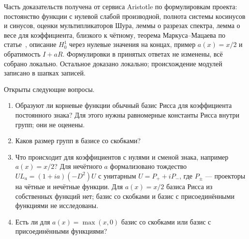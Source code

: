 \documentclass[12pt,a4paper]{article}
\begin{document}
Часть доказательств получена от сервиса Aristotle по формулировкам проекта: постоянство
функции с нулевой слабой производной, полнота системы косинусов и синусов, оценки
мультипликаторов Шура, леммы о разрезах спектра, лемма о весе для коэффициента, близкого
к чётному, теорема Маркуса--Мацаева по статье~\cite{S4}, описание $H_0^1$ через
нулевые значения на концах, пример $a(x)=x/2$ и обратимость $I+aR$. Формулировки в
принятых ответах не изменены, всё собрано локально. Остальное доказано локально;
происхождение модулей записано в шапках записей.

Открыты следующие вопросы.
\begin{enumerate}
\item Образуют ли корневые функции обычный базис Рисса для коэффициента постоянного
знака? Для этого нужны равномерные константы Рисса внутри групп; они не оценены.
\item Каков размер групп в базисе со скобками?
\item Что происходит для коэффициентов с нулями и сменой знака, например $a(x)=x/2$?
Для нечётного $a$ формализовано тождество $UL_a=(1+ia)(-D^2)U$ с унитарным
$U=P_++iP_-$, где $P_\pm$ --- проекторы на чётные и нечётные функции. Для $a(x)=x/2$
базиса Рисса из собственных функций нет; базис со скобками и базис с присоединёнными
функциями не исследованы.
\item Есть ли для $a(x)=\max(x,0)$ базис со скобками или базис с присоединёнными
функциями?
\end{enumerate}
\end{document}
